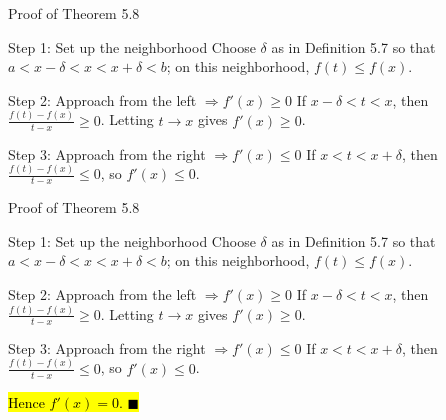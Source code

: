 \documentclass[aspectratio=169,12pt,t]{beamer}
\begin{document}
{%
\begin{frame}{Proof of Theorem 5.8}
  \begin{proofblock}{Step 1: Set up the neighborhood}
    Choose $\delta$ as in Definition 5.7 so that
    $a < x - \delta < x < x + \delta < b$;
    on this neighborhood, $f(t) \leq f(x)$.
  \end{proofblock}

  \begin{proofblock}{Step 2: Approach from the left $\Rightarrow f'(x) \geq 0$}
    If $x - \delta < t < x$, then
    $\frac{f(t) - f(x)}{t - x} \geq 0$.
    Letting $t \to x$ gives $f'(x) \geq 0$.
  \end{proofblock}

  \begin{proofblock}{Step 3: Approach from the right $\Rightarrow f'(x) \leq 0$}
    If $x < t < x + \delta$, then
    $\frac{f(t) - f(x)}{t - x} \leq 0$,
    so $f'(x) \leq 0$.
  \end{proofblock}

\end{frame}

\begin{frame}{Proof of Theorem 5.8}
  \begin{proofblock}{Step 1: Set up the neighborhood}
    Choose $\delta$ as in Definition 5.7 so that
    $a < x - \delta < x < x + \delta < b$;
    on this neighborhood, $f(t) \leq f(x)$.
  \end{proofblock}

  \begin{proofblock}{Step 2: Approach from the left $\Rightarrow f'(x) \geq 0$}
    If $x - \delta < t < x$, then
    $\frac{f(t) - f(x)}{t - x} \geq 0$.
    Letting $t \to x$ gives $f'(x) \geq 0$.
  \end{proofblock}

  \begin{proofblock}{Step 3: Approach from the right $\Rightarrow f'(x) \leq 0$}
    If $x < t < x + \delta$, then
    $\frac{f(t) - f(x)}{t - x} \leq 0$,
    so $f'(x) \leq 0$.
  \end{proofblock}

  \vspace{-0.7em}
  \hl{Hence $\boxed{f'(x) = 0.}$ \quad $\blacksquare$}

\end{frame}
}
\end{document}
